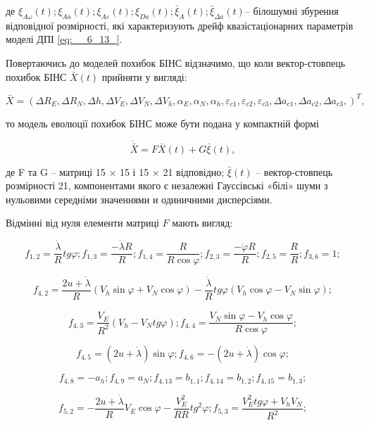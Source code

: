 де $\xi _{A\omega } (t);$$\xi _{Aa} (t);$$\xi _{A\varepsilon } (t);$$\xi _{Da} (t);$$\bar{
\xi }_{A} (t);$$\bar{\xi }_{\Delta a} (t)$-- білошумні збурення відповідної розмірності, 
які характеризують дрейф квазістаціонарних  параметрів моделі ДПІ \eqref{eq:__6_13_}.

Повертаючись 
до моделей похибок БІНС відзначимо, що коли  вектор-стовпець похибок БІНС $\bar{X}(t)$ прийняти 
у вигляді:

\[\bar{X}=(\Delta R_{E} ,\Delta R_{N} ,\Delta h,\Delta V_{E} ,\Delta V_{N} ,\Delta 
V_{h} ,\alpha _{E} ,\alpha _{N} ,\alpha _{h} ,\varepsilon _{c1} ,\varepsilon _{c2} 
,\varepsilon _{c3} ,\Delta a_{c1} ,\Delta a_{c2} ,\Delta a_{c3} ,)^{T} ,\] 

то модель еволюції похибок БІНС може бути подана у компактній формі

\begin{equation} \label{eq:__6_10_} \dot{\bar{X}}=F\bar{X}\left(t\right)+G\bar{
\xi }(t), \end{equation} 

де F та G   --  матриці 15 $\times$ 15 і 15 $\times$ 21 відповідно; $\bar{\xi }(t)$ -- вектор-стовпець 
розмірності 21, компонентами якого є незалежні Гауссівські «білі» шуми з нульовими 
середніми значеннями и одиничними дисперсіями.

Відмінні від нуля елементи матриці $F$ мають вигляд:



\[f_{1,2} =\frac{\dot{\lambda }}{R_{} } tg\varphi ;f_{1,3} =\frac{-\dot{\lambda }R_{} 
}{R} ;f_{1,4} =\frac{R_{} }{R\cos \varphi } ;f_{2,3} =\frac{-\dot{\varphi }R_{} }{R} 
;f_{2,5} =\frac{R_{} }{R} ;f_{3,6} =1;\] 

\[f_{4,2} =\frac{2u+\dot{\lambda }}{R_{} } \left(V_{h} \sin \varphi +V_{N} \cos \varphi 
\right)-\frac{\dot{\lambda }}{R_{} } tg\varphi \left(V_{h} \cos \varphi -V_{N} \sin 
\varphi \right);\] 

\[f_{4,3} =\frac{V_{E} }{R^{2} } \left(V_{h} -V_{N} tg\varphi \right);f_{4,4} =\frac{V_{N} 
\sin \varphi -V_{h} \cos \varphi }{R\cos \varphi } ;\] 

\[f_{4,5} =\left(2u+\dot{\lambda }\right)\sin \varphi ;f_{4,6} =-\left(2u+\dot{\lambda 
}\right)\cos \varphi ;\] 

\[f_{4,8} =-a_{h} ;f_{4,9} =a_{N} ;f_{4,13} =b_{1,1} ;f_{4,14} =b_{1,2} ;f_{4,15} 
=b_{1,3} ;\] 

\begin{equation} \label{eq:__6_11_} f_{5,2} =-\frac{2u+\dot{\lambda }}{R_{} } 
V_{E} \cos \varphi -\frac{V_{E}^{2} }{RR_{} } tg^{2} \varphi ;f_{5,3} =\frac{V_{E}^{2} 
tg\varphi +V_{h} V_{N} }{R^{2} } ; \end{equation} 

